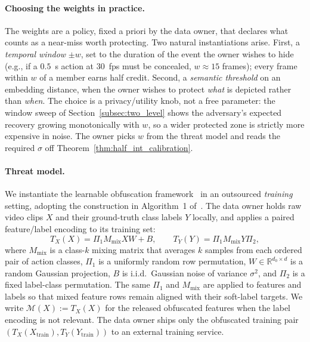 \documentclass[sigconf,anonymous, review]{acmart}
\begin{document}
\paragraph{Choosing the weights in practice.}
The weights are a policy, fixed a priori by the data owner, that declares what counts as a near-miss worth protecting. Two natural instantiations arise. First, a \emph{temporal window} $\pm w$, set to the duration of the event the owner wishes to hide (e.g., if a $0.5$~s action at $30$~fps must be concealed, $w \approx 15$ frames); every frame within $w$ of a member earns half credit. Second, a \emph{semantic threshold} on an embedding distance, when the owner wishes to protect \emph{what} is depicted rather than \emph{when}. The choice is a privacy/utility knob, not a free parameter: the window sweep of Section~\ref{subsec:two_level} shows the adversary's expected recovery growing monotonically with $w$, so a wider protected zone is strictly more expensive in noise. The owner picks $w$ from the threat model and reads the required $\sigma$ off Theorem~\ref{thm:half_int_calibration}.

\paragraph{Threat model.}
We instantiate the learnable obfuscation framework~\cite{xiao2024formal} in an outsourced \emph{training} setting, adopting the construction in Algorithm~1 of~\cite{xiao2024formal}. The data owner holds raw video clips $X$ and their ground-truth class labels $Y$ locally, and applies a paired feature/label encoding to its training set:
\[
T_X(X) = \Pi_1 M_{\mathrm{mix}} X W + B,
\qquad
T_Y(Y) = \Pi_1 M_{\mathrm{mix}} Y \Pi_2,
\]
where $M_{\mathrm{mix}}$ is a class-$k$ mixing matrix that averages $k$ samples from each ordered pair of action classes, $\Pi_1$ is a uniformly random row permutation, $W \in \mathbb{R}^{d_0 \times d}$ is a random Gaussian projection, $B$ is i.i.d.\ Gaussian noise of variance $\sigma^2$, and $\Pi_2$ is a fixed label-class permutation. The same $\Pi_1$ and $M_{\mathrm{mix}}$ are applied to features and labels so that mixed feature rows remain aligned with their soft-label targets. We write $\mathcal{M}(X) := T_X(X)$ for the released obfuscated features when the label encoding is not relevant. The data owner ships only the obfuscated training pair $(T_X(X_{\mathrm{train}}), T_Y(Y_{\mathrm{train}}))$ to an external training service.
\end{document}
